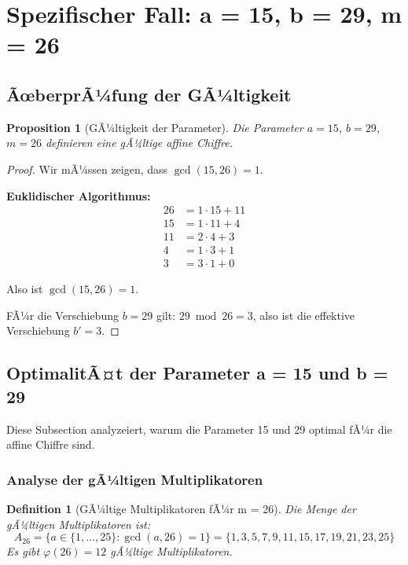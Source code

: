 ﻿\documentclass[12pt,a4paper]{article}
\newtheorem{definition}{Definition}
\newtheorem{proposition}[theorem]{Proposition}
\begin{document}
	\section{Spezifischer Fall: a = 15, b = 29, m = 26}
	
	\subsection{ÃœberprÃ¼fung der GÃ¼ltigkeit}
	
	\begin{proposition}[GÃ¼ltigkeit der Parameter]
		Die Parameter $a = 15$, $b = 29$, $m = 26$ definieren eine gÃ¼ltige affine Chiffre.
	\end{proposition}
	
	\begin{proof}
		Wir mÃ¼ssen zeigen, dass $\gcd(15, 26) = 1$.
		
		\textbf{Euklidischer Algorithmus:}
		\begin{align}
			26 &= 1 \cdot 15 + 11 \\
			15 &= 1 \cdot 11 + 4 \\
			11 &= 2 \cdot 4 + 3 \\
			4 &= 1 \cdot 3 + 1 \\
			3 &= 3 \cdot 1 + 0
		\end{align}
		
		Also ist $\gcd(15, 26) = 1$. \checkmark
		
		FÃ¼r die Verschiebung $b = 29$ gilt: $29 \bmod 26 = 3$, also ist die effektive Verschiebung $b' = 3$.
	\end{proof}
	
	\subsection{OptimalitÃ¤t der Parameter a = 15 und b = 29}
	
	Diese Subsection analyzeiert, warum die Parameter 15 und 29 optimal fÃ¼r die affine Chiffre sind.
	
	\subsubsection{Analyse der gÃ¼ltigen Multiplikatoren}
	
	\begin{definition}[GÃ¼ltige Multiplikatoren fÃ¼r m = 26]
		Die Menge der gÃ¼ltigen Multiplikatoren ist:
		\begin{equation}
			A_{26} = \{a \in \{1,\ldots,25\} : \gcd(a, 26) = 1\} = \{1, 3, 5, 7, 9, 11, 15, 17, 19, 21, 23, 25\}
		\end{equation}
		Es gibt $\varphi(26) = 12$ gÃ¼ltige Multiplikatoren.
	\end{definition}
	
\end{document}
